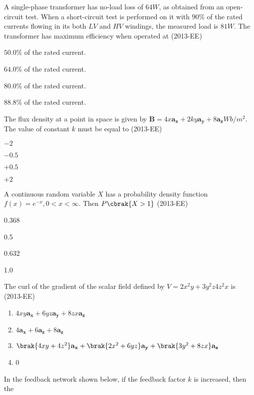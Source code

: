     \item A single-phase transformer has no-load loss of $64W$, as obtained from an open-circuit test. When a short-circuit test is performed on it with $90\%$ of the rated currents flowing in its both $LV$ and $HV$ windings, the measured load is $81W$. The transformer has maximum efficiency when operated at \hfill(2013-EE)
    \begin{enumerate}
        \begin{multicols}{2}
            \item $50.0\%$ of the rated current.
            \item $64.0\%$ of the rated current.
            \item $80.0\%$ of the rated current.
            \item $88.8\%$ of the rated current.
        \end{multicols}
    \end{enumerate}
    \item The flux density at a point in space is given by $\textbf{B} = 4x \textbf{a}_\textbf{x} + 2ky\textbf{a}_\textbf{y} + 8\textbf{a}_\textbf{z} Wb/m^2$. The value of constant $k$ must be equal to \hfill(2013-EE) 
    \begin{enumerate}
        \begin{multicols}{4}
            \item $-2$
            \item $-0.5$
            \item $+0.5$
            \item $+2$
        \end{multicols}
    \end{enumerate}
    \item A continuous random variable $X$ has a probability density function $f(x) = e^{-x}, 0 < x < \infty$. Then $P\cbrak{X > 1}$ \hfill(2013-EE)
    \begin{enumerate}
        \begin{multicols}{4}
            \item 0.368
            \item 0.5
            \item 0.632
            \item 1.0
        \end{multicols}
    \end{enumerate}
    \item The curl of the gradient of the scalar field defined by $V = 2x^2y + 3y^2z 
 4z^2x$ is \hfill(2013-EE)
 \begin{enumerate}
     \item $4xy\textbf{a}_\textbf{x} + 6yz\textbf{a}_\textbf{y} + 8zx \textbf{a}_ \textbf{z}$
     \item $4\textbf{a}_\textbf{x}+ 6\textbf{a}_\textbf{z}+ 8\textbf{a}_\textbf{z}$
     \item $\brak{4xy + 4z^2}\textbf{a}_\textbf{x} + \brak{2x^2 + 6yz}\textbf{a}_\textbf{y} + \brak{3y^2 + 8zx}\textbf{a}_\textbf{z}$
     \item 0
 \end{enumerate}
 \item In the feedback network shown below, if the feedback factor $k$ is increased, then the 

